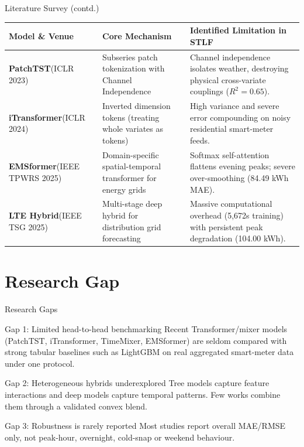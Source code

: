 \documentclass[aspectratio=169]{beamer}
\begin{document}
\begin{frame}{Literature Survey (contd.)}
  \scriptsize
  \begin{tabular}{p{2.6cm}p{5.2cm}p{5.4cm}}
    \toprule
    \textbf{Model \& Venue} & \textbf{Core Mechanism} & \textbf{Identified Limitation in STLF} \\ \midrule
    \textbf{PatchTST}\newline (ICLR 2023) & Subseries patch tokenization with Channel Independence & Channel independence isolates weather, destroying physical cross-variate couplings ($R^2=0.65$). \\ \addlinespace
    \textbf{iTransformer}\newline (ICLR 2024) & Inverted dimension tokens (treating whole variates as tokens) & High variance and severe error compounding on noisy residential smart-meter feeds. \\ \addlinespace
    \textbf{EMSformer}\newline (IEEE TPWRS 2025) & Domain-specific spatial-temporal transformer for energy grids & Softmax self-attention flattens evening peaks; severe over-smoothing (84.49 kWh MAE). \\ \addlinespace
    \textbf{LTE Hybrid}\newline (IEEE TSG 2025) & Multi-stage deep hybrid for distribution grid forecasting & Massive computational overhead (5,672s training) with persistent peak degradation (104.00 kWh). \\ \bottomrule
  \end{tabular}
\end{frame}

\section{Research Gap}
\begin{frame}{Research Gaps}
  \begin{block}{Gap 1: Limited head-to-head benchmarking}
    Recent Transformer/mixer models (PatchTST, iTransformer, TimeMixer, EMSformer) are seldom compared with strong tabular baselines such as LightGBM on real aggregated smart-meter data under one protocol.
  \end{block}
  \begin{block}{Gap 2: Heterogeneous hybrids underexplored}
    Tree models capture feature interactions and deep models capture temporal patterns. Few works combine them through a validated convex blend.
  \end{block}
  \begin{block}{Gap 3: Robustness is rarely reported}
    Most studies report overall MAE/RMSE only, not peak-hour, overnight, cold-snap or weekend behaviour.
  \end{block}
\end{frame}
\end{document}
